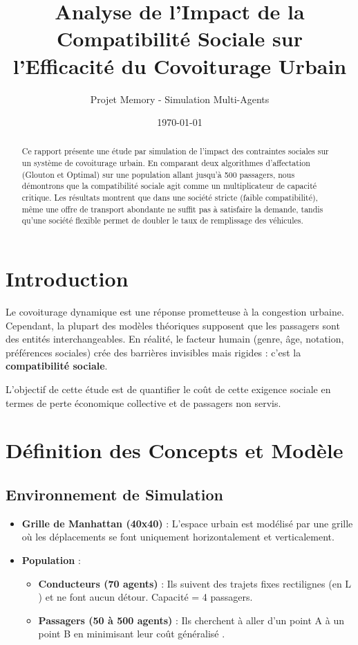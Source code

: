 \documentclass[a4paper,12pt]{article}
\title{\textbf{Analyse de l'Impact de la Compatibilité Sociale sur l'Efficacité du Covoiturage Urbain}}
\author{Projet Memory - Simulation Multi-Agents}
\date{\today}
\begin{document}
\maketitle

\begin{abstract}
Ce rapport présente une étude par simulation de l'impact des contraintes sociales sur un système de covoiturage urbain. En comparant deux algorithmes d'affectation (Glouton et Optimal) sur une population allant jusqu'à 500 passagers, nous démontrons que la compatibilité sociale agit comme un multiplicateur de capacité critique. Les résultats montrent que dans une société \og stricte \fg{} (faible compatibilité), même une offre de transport abondante ne suffit pas à satisfaire la demande, tandis qu'une société \og flexible \fg{} permet de doubler le taux de remplissage des véhicules.
\end{abstract}

\section{Introduction}
Le covoiturage dynamique est une réponse prometteuse à la congestion urbaine. Cependant, la plupart des modèles théoriques supposent que les passagers sont des entités interchangeables. En réalité, le facteur humain (genre, âge, notation, préférences sociales) crée des barrières invisibles mais rigides : c'est la \textbf{compatibilité sociale}.

L'objectif de cette étude est de quantifier le coût de cette \og exigence sociale \fg{} en termes de perte économique collective et de passagers non servis.

\section{Définition des Concepts et Modèle}

\subsection{Environnement de Simulation}
\begin{itemize}
    \item \textbf{Grille de Manhattan (40x40)} : L'espace urbain est modélisé par une grille où les déplacements se font uniquement horizontalement et verticalement.
    \item \textbf{Population} : 
    \begin{itemize}
        \item \textbf{Conducteurs (70 agents)} : Ils suivent des trajets fixes rectilignes (\og en L \fg{}) et ne font aucun détour. Capacité = 4 passagers.
        \item \textbf{Passagers (50 à 500 agents)} : Ils cherchent à aller d'un point A à un point B en minimisant leur \og coût généralisé \fg{}.
    \end{itemize}
\end{itemize}
\end{document}
